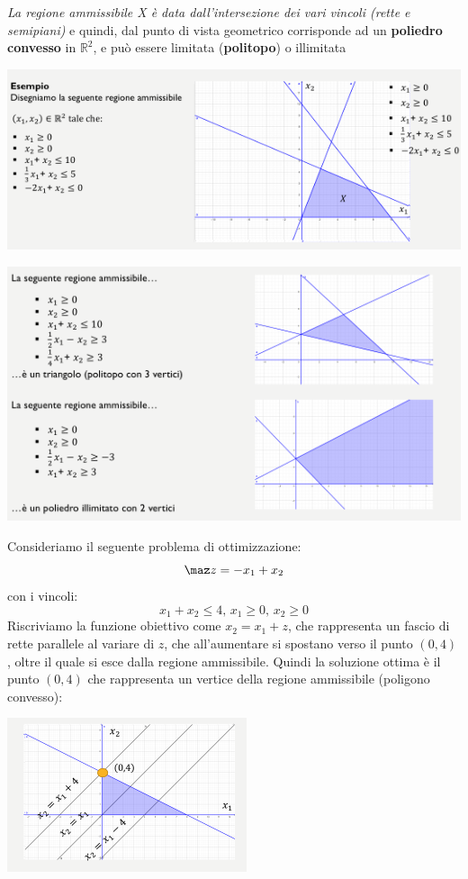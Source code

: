 \documentclass[a4paper,12pt, oneside]{book}
\begin{document}
\textit{La regione ammissibile X è data dall’intersezione dei vari
  vincoli (rette e semipiani)} e quindi, dal punto di vista geometrico
corrisponde ad un \textbf{poliedro convesso} in $\mathbb{R}^2$, e può
essere limitata (\textbf{politopo}) o illimitata
\begin{center}
  \includegraphics[scale = 0.7]{img/2d1.png}
\end{center}
\begin{center}
  \includegraphics[scale = 0.7]{img/2d2.png}
\end{center}
\begin{esempio}
  Consideriamo il seguente problema di ottimizzazione:
  \[\maz z = -x_1+x_2\]
  con i vincoli:
  \[x_1+x_2\leq 4,\, x_1\geq 0,\, x_2\geq 0\]
  Riscriviamo la funzione obiettivo come $x_2=x_1+z$, che
  rappresenta un fascio di rette parallele al variare di $z$, che
  all'aumentare si spostano verso il punto $(0,4)$, oltre il quale si
  esce dalla regione ammissibile. Quindi la soluzione ottima è il punto
  $(0,4)$ che rappresenta un vertice della regione ammissibile (poligono
  convesso):
  \begin{center}
    \includegraphics[scale = 0.7]{img/2d3.png}
  \end{center}
\end{esempio}
\end{document}
